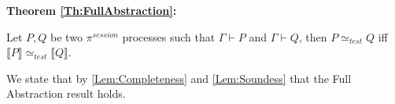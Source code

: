 \vspace{10pt}


\textbf{Theorem \ref{Th:FullAbstraction}:}

Let $P, Q$ be two $\pi^{session}$ processes such that $\Gamma \vdash P$ and $\Gamma \vdash Q$, then $P \simeq_{test} Q$ iff $\llbracket P \rrbracket \simeq_{test} \llbracket Q \rrbracket$.

We state that by \ref{Lem:Completeness} and \ref{Lem:Soundess} that the Full Abstraction result holds. 

